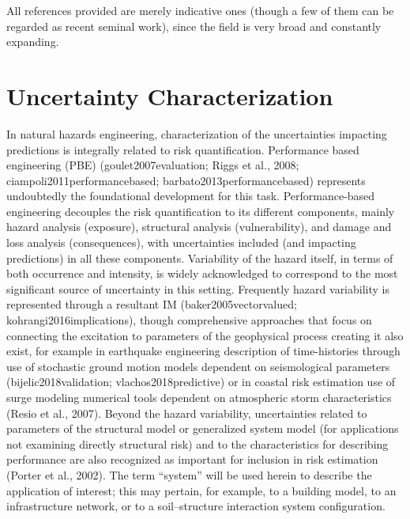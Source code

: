 All references provided are merely indicative ones (though a few of them can be regarded as recent seminal work), since the field is very broad and constantly expanding.

\section{Uncertainty Characterization}
\label{sec:uq_characterization}

In natural hazards engineering, characterization of the uncertainties impacting predictions is integrally related to risk quantification. Performance based engineering (PBE) (goulet2007evaluation; Riggs et al., 2008; ciampoli2011performancebased; barbato2013performancebased) represents undoubtedly the foundational development for this task. Performance-based engineering decouples the risk quantification to its different components, mainly hazard analysis (exposure), structural analysis (vulnerability), and damage and loss analysis (consequences), with uncertainties included (and impacting predictions) in all these components. Variability of the hazard itself, in terms of both occurrence and intensity, is widely acknowledged to correspond to the most significant source of uncertainty in this setting. Frequently hazard variability is represented through a resultant IM (baker2005vectorvalued; kohrangi2016implications), though comprehensive approaches that focus on connecting the excitation to parameters of the geophysical process creating it also exist, for example in earthquake engineering description of time-histories through use of stochastic ground motion models dependent on seismological parameters (bijelic2018validation; vlachos2018predictive) or in coastal risk estimation use of surge modeling numerical tools dependent on atmospheric storm characteristics (Resio et al., 2007). Beyond the hazard variability, uncertainties related to parameters of the structural model or generalized system model (for applications not examining directly structural risk) and to the characteristics for describing performance are also recognized as important for inclusion in risk estimation (Porter et al., 2002). The term “system” will be used herein to describe the application of interest; this may pertain, for example, to a building model, to an infrastructure network, or to a soil–structure interaction system configuration. 


